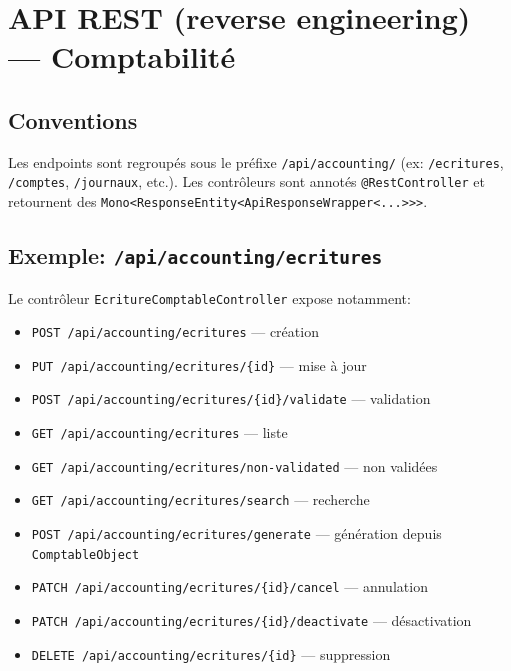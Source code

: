 \documentclass[12pt,a4paper]{report}
\begin{document}
\chapter{API REST (reverse engineering) --- Comptabilité}
\section{Conventions}
Les endpoints sont regroupés sous le préfixe \texttt{/api/accounting/} (ex: \texttt{/ecritures}, \texttt{/comptes}, \texttt{/journaux}, etc.).
Les contrôleurs sont annotés \texttt{@RestController} et retournent des \texttt{Mono<ResponseEntity<ApiResponseWrapper<...>>>}.

\section{Exemple: \texttt{/api/accounting/ecritures}}
Le contrôleur \texttt{EcritureComptableController} expose notamment:
\begin{itemize}
  \item \texttt{POST /api/accounting/ecritures} --- création
  \item \texttt{PUT /api/accounting/ecritures/\{id\}} --- mise à jour
  \item \texttt{POST /api/accounting/ecritures/\{id\}/validate} --- validation
  \item \texttt{GET /api/accounting/ecritures} --- liste
  \item \texttt{GET /api/accounting/ecritures/non-validated} --- non validées
  \item \texttt{GET /api/accounting/ecritures/search} --- recherche
  \item \texttt{POST /api/accounting/ecritures/generate} --- génération depuis \texttt{ComptableObject}
  \item \texttt{PATCH /api/accounting/ecritures/\{id\}/cancel} --- annulation
  \item \texttt{PATCH /api/accounting/ecritures/\{id\}/deactivate} --- désactivation
  \item \texttt{DELETE /api/accounting/ecritures/\{id\}} --- suppression
\end{itemize}
\end{document}
